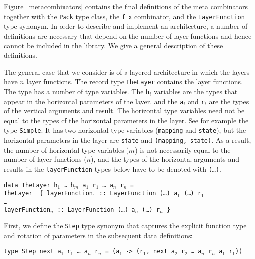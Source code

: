 \par Figure~\ref{metacombinators} contains the final
        definitions of the meta combinators together with the \texttt{Pack} type class,
        the \texttt{fix} combinator, and the \texttt{LayerFunction} type synonym. In
        order to describe and implement an architecture, a number of definitions are
        necessary that depend on the number of layer functions and hence cannot be
        included in the library. We give a general description of these
        definitions.
\par {}The general case that we consider
        is of a layered architecture in which the layers have $n$ layer functions. The
        record type \texttt{TheLayer} contains the layer functions. The type has a
        number of type variables. The \texttt{h$_i$} variables are the types that
        appear in the horizontal parameters of the layer, and the \texttt{a$_i$} and
        \texttt{r$_i$} are the types of the vertical arguments and result. The
        horizontal type variables need not be equal to the types of the horizontal
        parameters in the layer. See for example the type \texttt{Simple}. It has two
        horizontal type variables (\texttt{mapping} and \texttt{state}), but the
        horizontal parameters in the layer are \texttt{state} and \texttt{(mapping,
        state)}. As a result, the number of horizontal type variables ($m$) is not
        necessarily equal to the number of layer functions ($n$), and the types of the
        horizontal arguments and results in the \texttt{layerFunction} types below have
        to be denoted with \texttt{(\dots)}.\begin{tabbing}
{\tt data Th}\={\tt eLayer h$_1$ \dots ~h$_m$ a$_1$ r$_1$ \dots ~a$_n$ r$_n$ = }\\
\> {\tt TheLayer~ \{~}\={\tt layerFunction$_1$}\verb| :: |{\tt LayerFunction (\dots) a$_1$ (\dots) r$_1$}\\
\>\> {\tt \dots }\\
\>\> {\tt layerFunction$_n$}\verb| :: |{\tt LayerFunction (\dots) a$_n$ (\dots) r$_n$ \}}\\
\end{tabbing}
\par First, we define the \texttt{Step} type synonym that captures the
        explicit function type and rotation of parameters in the subsequent data
        definitions:\begin{tabbing}
{\tt type St}\={\tt ep next a$_1$ r$_1$ \dots~a$_n$ r$_n$ = (a$_1$ -> (r$_1$, next a$_2$ r$_2$ \dots~a$_n$ r$_n$ a$_1$ r$_1$))}
\end{tabbing}

